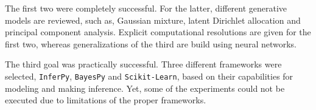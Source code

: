 The first two were completely successful. For the latter, different generative models are reviewed, such as, Gaussian mixture, latent Dirichlet allocation and principal component analysis. Explicit computational resolutions are given for the first two, whereas generalizations of the third are build using neural networks.

The third goal was practically successful. Three different frameworks were selected, \texttt{InferPy}, \texttt{BayesPy} and \texttt{Scikit-Learn}, based on their capabilities for modeling and making inference. Yet, some of the experiments could not be executed due to limitations of the proper frameworks.
